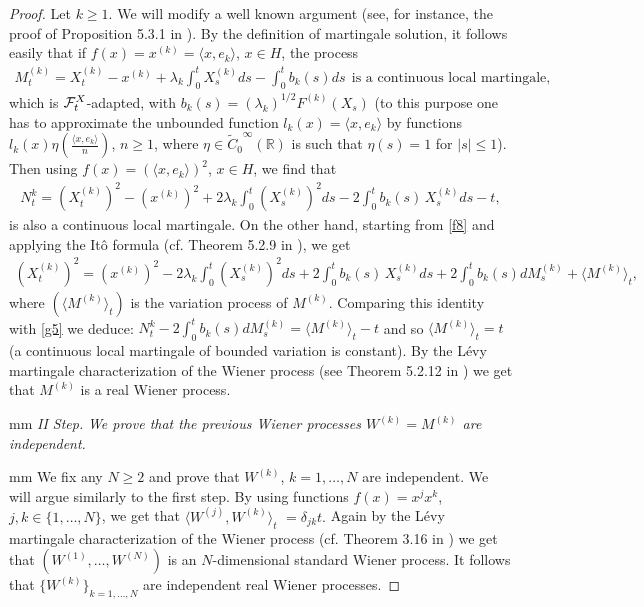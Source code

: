 \documentclass[preprint]{imsart}
\def\R{\mathbb R}
\begin{document}
\begin{proof}
Let $k \ge 1$. We will  modify   a well known argument
 (see, for instance, the proof of Proposition 5.3.1 in \cite{EK}).
 By the definition of martingale solution,
it follows easily that if
$f(x)= x^{(k)} = \langle x, e_k\rangle $, $x \in H$, the process
 \begin{equation} \label{f8}
\begin{array}{l}
M_t^{(k)} = 
 X^{(k)}_t  -  x^{(k)} + \lambda_k\int_0^t X^{(k)}_s ds - \int_0^t b_k(s) ds \,\; \text{is a continuous  local martingale},
 \end{array} 
 \end{equation}
   which is ${\cal F}_t^X$-adapted,  with    
 $b_k(s) = (\lambda_k)^{1/2}F^{(k)}(X_s)$ {  (to this purpose one has  to approximate the unbounded function $l_k(x)=\langle x, e_k\rangle$ by functions 
  $l_k (x) \eta (\frac{\langle x, e_k\rangle}{n})$, $n \ge 1$, where  
  $\eta \in {\tilde C_0}^{\infty}(\R)$ is such that  $\eta(s)=1$ for $|s| \le 1$).
 }     Then
    using $f(x) = (\langle x, e_k\rangle)^2 $, $x \in H$, we find that
\begin{equation} \label{g5}
\begin{array}{l}     
N_t^k = (X^{(k)}_t)^2 - (x^{(k)})^2 + 2\lambda_k\int_0^t (X^{(k)}_s)^2 ds -
2\int_0^t b_k(s)\, X^{(k)}_s  ds - t,
\end{array} 
\end{equation}
is also a continuous local martingale.  On the other hand, starting from \eqref{f8}   and
applying the It\^o formula (cf. Theorem 5.2.9 in \cite{EK}), we get
$$
\begin{array}{l}
(X^{(k)}_t)^2 = (x^{(k)})^2 - 2\lambda_k\int_0^t (X^{(k)}_s)^2 ds +
2\int_0^t b_k(s) \,X^{(k)}_s  ds + 2 \int_0^t b_k(s)   dM_s^{(k)} +  \langle M^{(k)} \rangle_t,
\end{array} 
$$
where $(\langle M^{(k)} \rangle_t)$      is the variation process of $M^{(k)}$.
Comparing this identity with \eqref{g5} we deduce: $N_t^k - 2 \int_0^t b_k(s)   dM_s^{(k)}= \langle M^{(k)}
\rangle_t -t $ and so 
 $\langle M^{(k)}
\rangle_t =t$  
 (a continuous local martingale of bounded variation is constant).
 By the  L\'evy martingale characterization of the Wiener process (see Theorem 5.2.12 in \cite{EK}) we get that $M^{(k)}$ is a real Wiener process.


 
 
 mm       
 \noindent \textit{II Step.} \textsl{   We prove that the previous Wiener processes $W^{(k)} = M^{(k)} $   are independent.}

 mm  We fix any   $N \ge 2$ and prove that $W^{(k)}$, $k=1, \ldots, N$ are independent. 
  We will argue similarly  to the first step.
By using  functions $f(x)= x^j x^k$, $j,k \in \{ 1, \ldots ,N\}$, we get that
$
\langle W^{(j)}, W^{(k)} \rangle_t
$ $ = \delta_{jk} t.
$
 Again by the  L\'evy martingale characterization of the Wiener process (cf. Theorem 3.16 in \cite{KS})
we get that $(W^{(1)}, \ldots, W^{(N)})$ is an $N$-dimensional standard Wiener process.
It follows that $\{W^{(k)} \}_{k =1, \ldots, N}$ are independent real  Wiener processes.
\end{proof}
\end{document}
